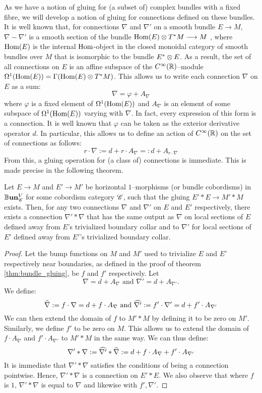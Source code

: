 As we have a notion of gluing for (a subset of) complex bundles with a fixed
fibre, we will develop a notion of gluing for connections defined on these
bundles. It is well known that, for connections $\nabla$ and $\nabla'$ on a
smooth bundle $E \to M$, $\nabla - \nabla'$ is a smooth section of the bundle
$\text{Hom}(E) \otimes T^*M \stackrel{}{\longrightarrow} M$ \cite[Lemma 2.2]{Conn},
where $\text{Hom}(E)$ is the internal $\text{Hom}$-object in
the closed monoidal category of smooth bundles over $M$ that is isomorphic to
the bundle $E^* \otimes E$. As a result, the set of all
connections on $E$ is an affine subspace of the $C^{\infty}(\mathbb{R})$--module
$\Omega^1(\text{Hom}(E)) = \Gamma(\text{Hom}(E) \otimes T^*M)$. This allows us to write each
connection $\nabla$ on $E$ as a sum:
\[
  \nabla = \varphi + A_{\nabla}
\]
where $\varphi$ is a fixed element of $\Omega^1(\text{Hom}(E))$ and $A_{\nabla}$
is an element of some subspace of $\Omega^1(\text{Hom}(E))$ varying with $\nabla$. In
fact, every expression of this form is a connection. It is well known that
$\varphi$ can be taken as the exterior derivative operator $d$. In particular,
this allows us to define an action of $C^{\infty}(\mathbb{R})$ on the set of connections as
follows:
\[
  r \cdot \nabla := d + r \cdot A_{\nabla} =: d + A_{r \cdot \nabla}
\]
From this, a gluing operation for (a class of) connections is immediate. This
is made precise in the following theorem.

\begin{thm}
Let $E \to M$ and $E' \to M'$ be horizontal $1$--morphisms
(or bundle cobordisms) in $\mathbb{B}\textbf{un}^V_{\mathscr{C}}$ for some cobordism category $\mathscr{C}$,
such that the gluing $E' * E \to M' * M$ exists. Then, for any two connections
$\nabla$ and $\nabla'$ on $E$ and $E'$ respectively, there exists a connection
$\nabla' * \nabla$ that has the same output as $\nabla$ on local sections of $E$
defined away from $E$'s trivialized boundary collar and to $\nabla'$ for local
sections of $E'$ defined away from $E'$'s trivialized boundary collar.
\end{thm}
\begin{proof}
Let the bump functions on $M$ and $M'$ used to trivialize $E$ and $E'$
respectively near boundaries, as defined in the proof of theorem
\ref{thm:bundle_gluing}, be $f$ and $f'$ respectively. Let
\[
  \nabla = d + A_{\nabla} \text{ and } \nabla' = d + A_{\nabla'}.
\]
We define:
\[
  \widehat{\nabla} := f \cdot \nabla = d + f \cdot A_{\nabla}
  \text{ and } \widehat{\nabla'} := f' \cdot \nabla' = d + f' \cdot A_{\nabla'}
\]
We can then extend the domain of $f$ to $M' * M$ by defining it to be zero on
$M'$. Similarly, we define $f'$ to be zero on $M$. This allows us to extend the
domain of $f \cdot A_{\nabla}$ and $f' \cdot A_{\nabla'}$ to $M' * M$ in the
same way. We can thus define:
\[
  \nabla' * \nabla := \widehat{\nabla'} * \widehat{\nabla}
    := d + f \cdot A_{\nabla} + f' \cdot A_{\nabla'}
\]
It is immediate that $\nabla' * \nabla$ satisfies the conditions of being a
connection pointwise. Hence, $\nabla' * \nabla$ is a connection on $E' * E$. We
also observe that where $f$ is $1$, $\nabla' * \nabla$ is equal to $\nabla$ and
likewise with $f', \nabla'$.
\end{proof}


